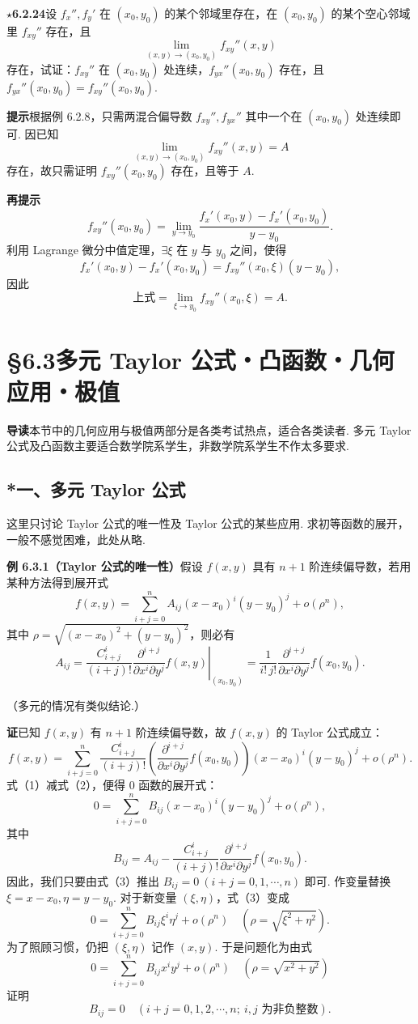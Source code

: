 \documentclass[UTF8,12pt,a4paper,fontset=fandol]{ctexart}
\begin{document}
\noindent\textbf{\ensuremath{\star}6.2.24}\quad 设 $f_x'',f_y'$ 在 $(x_0,y_0)$ 的某个邻域里存在，在 $(x_0,y_0)$ 的某个空心邻域里 $f_{xy}''$ 存在，且
\[
  \lim_{(x,y)\to(x_0,y_0)}f_{xy}''(x,y)
\]
存在，试证：$f_{xy}''$ 在 $(x_0,y_0)$ 处连续，$f_{yx}''(x_0,y_0)$ 存在，且 $f_{yx}''(x_0,y_0)=f_{xy}''(x_0,y_0)$.

\noindent\textbf{提示}\quad 根据例 6.2.8，只需两混合偏导数 $f_{xy}'',f_{yx}''$ 其中一个在 $(x_0,y_0)$ 处连续即可. 因已知
\[
  \lim_{(x,y)\to(x_0,y_0)}f_{xy}''(x,y)=A
\]
存在，故只需证明 $f_{xy}''(x_0,y_0)$ 存在，且等于 $A$.

\noindent\textbf{再提示}\quad
\[
  f_{xy}''(x_0,y_0)=\lim_{y\to y_0}
  \frac{f_x'(x_0,y)-f_x'(x_0,y_0)}{y-y_0}.
\]
利用 Lagrange 微分中值定理，$\exists\xi$ 在 $y$ 与 $y_0$ 之间，使得
\[
  f_x'(x_0,y)-f_x'(x_0,y_0)=f_{xy}''(x_0,\xi)(y-y_0),
\]
因此
\[
  \text{上式}=\lim_{\xi\to y_0}f_{xy}''(x_0,\xi)=A.
\]

\section*{§6.3\quad 多元 Taylor 公式・凸函数・几何应用・极值}

\noindent\textbf{导读}\quad 本节中的几何应用与极值两部分是各类考试热点，适合各类读者. 多元 Taylor 公式及凸函数主要适合数学院系学生，非数学院系学生不作太多要求.

\subsection*{*一、多元 Taylor 公式}

这里只讨论 Taylor 公式的唯一性及 Taylor 公式的某些应用. 求初等函数的展开，一般不感觉困难，此处从略.

\noindent\textbf{例 6.3.1（Taylor 公式的唯一性）}\quad 假设 $f(x,y)$ 具有 $n+1$ 阶连续偏导数，若用某种方法得到展开式
\[
  f(x,y)=\sum_{i+j=0}^{n}A_{ij}(x-x_0)^i(y-y_0)^j+o(\rho^n), \tag{1}
\]
其中 $\rho=\sqrt{(x-x_0)^2+(y-y_0)^2}$，则必有
\[
  A_{ij}=\frac{C_{i+j}^i}{(i+j)!}
  \left.
  \frac{\partial^{i+j}}{\partial x^i\partial y^j}f(x,y)
  \right|_{(x_0,y_0)}
  =\frac1{i!\,j!}
  \frac{\partial^{i+j}}{\partial x^i\partial y^j}f(x_0,y_0).
\]

（多元的情况有类似结论.）

\noindent\textbf{证}\quad 已知 $f(x,y)$ 有 $n+1$ 阶连续偏导数，故 $f(x,y)$ 的 Taylor 公式成立：
\[
  f(x,y)=\sum_{i+j=0}^{n}
  \frac{C_{i+j}^i}{(i+j)!}
  \left(\frac{\partial^{i+j}}{\partial x^i\partial y^j}f(x_0,y_0)\right)
  (x-x_0)^i(y-y_0)^j+o(\rho^n). \tag{2}
\]
式（1）减式（2），便得 0 函数的展开式：
\[
  0=\sum_{i+j=0}^{n}B_{ij}(x-x_0)^i(y-y_0)^j+o(\rho^n), \tag{3}
\]
其中
\[
  B_{ij}=A_{ij}-\frac{C_{i+j}^i}{(i+j)!}
  \frac{\partial^{i+j}}{\partial x^i\partial y^j}f(x_0,y_0).
\]
因此，我们只要由式（3）推出 $B_{ij}=0\ (i+j=0,1,\cdots,n)$ 即可. 作变量替换 $\xi=x-x_0,\eta=y-y_0$. 对于新变量 $(\xi,\eta)$，式（3）变成
\[
  0=\sum_{i+j=0}^{n}B_{ij}\xi^i\eta^j+o(\rho^n)
  \quad(\rho=\sqrt{\xi^2+\eta^2}).
\]
为了照顾习惯，仍把 $(\xi,\eta)$ 记作 $(x,y)$. 于是问题化为由式
\[
  0=\sum_{i+j=0}^{n}B_{ij}x^iy^j+o(\rho^n)
  \quad(\rho=\sqrt{x^2+y^2}) \tag{4}
\]
证明
\[
  B_{ij}=0\quad(i+j=0,1,2,\cdots,n;\ i,j\text{ 为非负整数}).
\]
\end{document}
